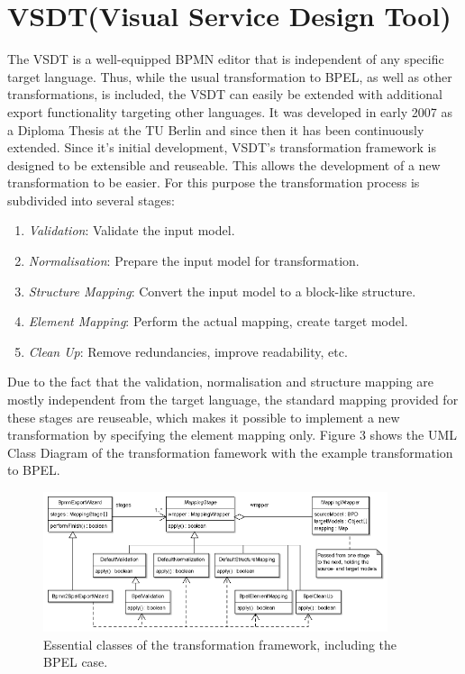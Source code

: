 \section{VSDT(Visual Service Design Tool)}
\label{sec:vsdt}
The VSDT \cite{5,2,3,1} is a well-equipped BPMN editor that is independent of any specific target language. Thus, while the usual transformation to BPEL, as well as other transformations, is included, the VSDT can easily be extended with additional export functionality targeting other languages. It was developed in early 2007 as a Diploma Thesis at the TU Berlin and since then it has been continuously extended. Since it's initial development, VSDT's transformation framework is designed to be extensible and reuseable. This allows the development of a new transformation to be easier. For this purpose the transformation process is subdivided into several stages: 
\begin{enumerate}
	\item \textit{Validation}: Validate the input model.
	\item \textit{Normalisation}: Prepare the input model for transformation.
	\item \textit{Structure Mapping}: Convert the input model to a block-like structure.
	\item \textit{Element Mapping}: Perform the actual mapping, create target model.
	\item \textit{Clean Up}: Remove redundancies, improve readability, etc.
\end{enumerate}

Due to the fact that the validation, normalisation and structure mapping are mostly independent from the target language, the standard mapping provided for these stages are reuseable, which makes it possible to implement a new transformation by specifying the element mapping only. Figure 3 shows the UML Class Diagram of the transformation famework with the example transformation to BPEL.
\begin{figure}[h]
	\centering
		\includegraphics[width=0.90\textwidth]{images/transformation.png}
	\caption{Essential classes of the transformation framework, including the BPEL case.\cite{3}}
	\label{fig:transform}
\end{figure}\\


